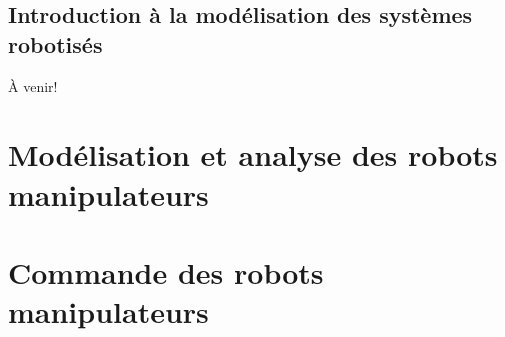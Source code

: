 \documentclass[letterpaper,oneside,french]{book}
\begin{document}

\setcounter{tocdepth}{0}\noptcrule
{\hypersetup{linkcolor=black}
\doparttoc[n]
\tableofcontents
\newpage
}


\chapter{Introduction à la modélisation des systèmes robotisés} À venir!


\part{Modélisation et analyse des robots manipulateurs}
\label{sec:manip}
{\hypersetup{linkcolor=black}
\parttoc
}





% 
% 
% 

\part{Commande des robots manipulateurs}
\label{sec:manip_control}
{\hypersetup{linkcolor=black}
\parttoc
}

% 
% 
% 
% 

\end{document}

